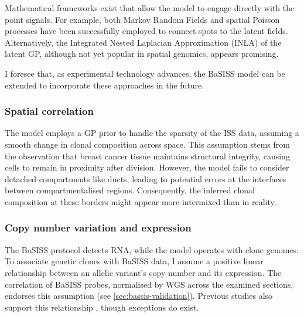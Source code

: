 Mathematical frameworks exist that allow the model to engage directly with the point signals. For example, both Markov Random Fields \parencite{Petukhov2022-pv} and spatial Poisson processes \parencite{Qian2020-mp} have been successfully employed to connect spots to the latent fields. Alternatively, the Integrated Nested Laplacian Approximation (INLA) \parencite{Rue2009-an} of the latent \ac{GP}, although not yet popular in spatial genomics, appears promising.

I foresee that, as experimental technology advances, the \ac{BaSISS} model can be extended to incorporate these approaches in the future.


\subsubsection*{Spatial correlation}


The model employs a \ac{GP} prior to handle the sparsity of the \ac{ISS} data, assuming a smooth change in clonal composition across space. This assumption stems from the observation that breast cancer tissue maintains structural integrity, causing cells to remain in proximity after division. However, the model fails to consider detached compartments like ducts, leading to potential errors at the interfaces between compartmentalised regions. Consequently, the inferred clonal composition at these borders might appear more intermixed than in reality. 

\subsubsection*{Copy number variation and expression}
The \ac{BaSISS} protocol detects RNA, while the model operates with clone genomes. To associate genetic clones with \ac{BaSISS} data, I assume a positive linear relationship between an allelic variant's copy number and its expression. The correlation of \ac{BaSISS} probes, normalised by \ac{WGS} across the examined sections, endorses this assumption (see \cref{sec:bassis-validation}). Previous studies also support this relationship \parencite{Handsaker2015-jx}, though exceptions do exist.

